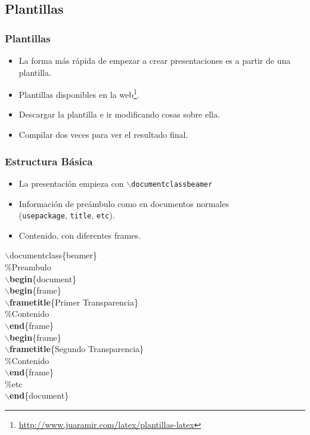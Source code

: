 \documentclass[aspectratio=43]{beamer}%
\newcommand\azul[1]{\textcolor[RGB]{19,15,204}{#1}}
\newcommand\verde[1]{\textcolor[RGB]{5,101,99}{#1}}
\begin{document}
\subsection{Plantillas}
\begin{frame}[fragile]
\frametitle{\textbf{Plantillas}}
\justifying
 \begin{itemize}\justifying
  \item La forma más rápida de empezar a crear presentaciones es a partir de una plantilla.
  \item Plantillas disponibles en la web\footnote{\url{http://www.juaramir.com/latex/plantillas-latex}}.
  \item Descargar la plantilla e ir modificando cosas sobre ella.
  \item Compilar dos veces para ver el resultado final.
\end{itemize}

\end{frame}

\begin{frame}[fragile]
\frametitle{\textbf{Estructura Básica}}
\justifying
 \begin{itemize}\justifying
  \item La presentación empieza con \texttt{$\backslash$documentclass{beamer}}
  \item Información de preámbulo como en documentos normales\\(\texttt{usepackage}, \texttt{title}, \texttt{etc}).
  \item Contenido, con diferentes frames.
\end{itemize}

\begin{block}{}\small
$\backslash$\azul{documentclass}\{beamer\}\\
\verde{\%Preambulo}\\
$\backslash$\textbf{begin}\{document\}\\
$\backslash$\textbf{begin}\{frame\}\\
$\backslash$\textbf{frametitle}\{Primer Transparencia\}\\
\verde{\%Contenido}\\
$\backslash$\textbf{end}\{frame\}\\
$\backslash$\textbf{begin}\{frame\}\\
$\backslash$\textbf{frametitle}\{Segundo Transparencia\}\\
\verde{\%Contenido}\\
$\backslash$\textbf{end}\{frame\}\\
\%etc\\
$\backslash$\textbf{end}\{document\}\\
\end{block}




\end{frame}
\end{document}
